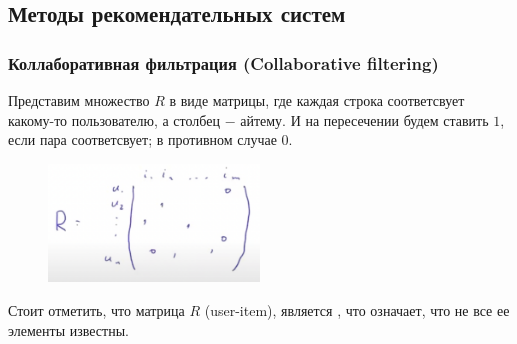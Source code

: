         \subsection{Методы рекомендательных систем}
            \subsubsection{Коллаборативная фильтрация (Collaborative filtering)}

                Представим множество $R$ в виде матрицы, где каждая строка соответсвует какому-то пользователю, а столбец $-$ айтему. И на пересечении будем ставить $1$, если пара соответсвует; в противном случае $0$.
                
                \begin{figure}[H]
                    \centering
                    \includegraphics[width=0.5\textwidth]{images/14lecture/R-matrix.png}
                \end{figure} 

                Стоит отметить, что матрица $R$ (user-item), является , что означает, что не все ее элементы известны.

